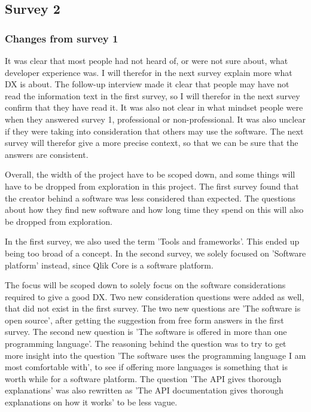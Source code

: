 \documentclass[11pt]{article}
\begin{document}
\begin{multicols}{2}
    \subsection{Survey 2}

    \subsubsection{Changes from survey 1}

    It was clear that most people had not heard of, or were not sure about,
    what developer experience was. I will therefor in the next survey
    explain more what DX is about. The follow-up interview made it clear
    that people may have not read the information text in the first survey,
    so I will therefor in the next survey confirm that they have read it. It
    was also not clear in what mindset people were when they answered survey
    1, professional or non-professional. It was also unclear if they were
    taking into consideration that others may use the software. The next
    survey will therefor give a more precise context, so that we can be sure
    that the answers are consistent.

    Overall, the width of the project have to be scoped down, and some
    things will have to be dropped from exploration in this project. The
    first survey found that the creator behind a software was less
    considered than expected. The questions about how they find new software
    and how long time they spend on this will also be dropped from
    exploration.

    In the first survey, we also used the term 'Tools and frameworks'. This
    ended up being too broad of a concept. In the second survey, we solely
    focused on 'Software platform' instead, since Qlik Core is a software platform.

    The focus will be scoped down to solely focus on the software
    considerations required to give a good DX. Two new consideration
    questions were added as well, that did not exist in the first survey.
    The two new questions are 'The software is open source', after getting
    the suggestion from free form answers in the first survey. The second
    new question is 'The software is offered in more than one programming
    language'. The reasoning behind the question was to try to get more
    insight into the question 'The software uses the programming language I
    am most comfortable with', to see if offering more languages is
    something that is worth while for a software platform. The question 'The
    API gives thorough explanations' was also rewritten as 'The API
    documentation gives thorough explanations on how it works' to be less
    vague.


\end{multicols}
\end{document}
